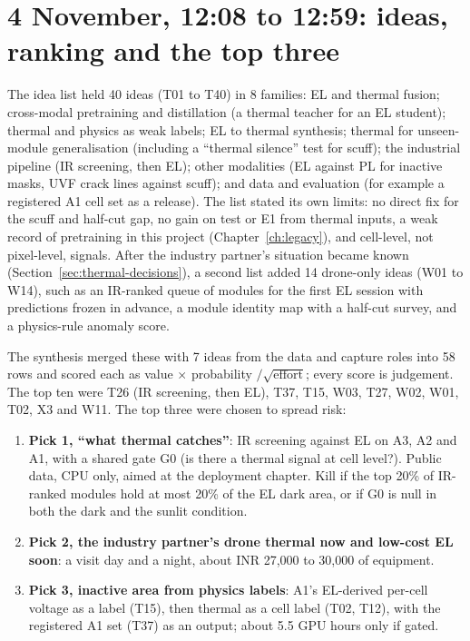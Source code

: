 \section{4 November, 12:08 to 12:59: ideas, ranking and the top three}\label{sec:thermal-ideas}

The idea list held 40 ideas (T01 to T40) in 8 families: EL and thermal fusion; cross-modal pretraining and distillation (a thermal
teacher for an EL student); thermal and physics as weak labels; EL to thermal synthesis; thermal for unseen-module generalisation
(including a ``thermal silence'' test for scuff); the industrial pipeline (IR screening, then EL); other modalities (EL against PL
for inactive masks, UVF crack lines against scuff); and data and evaluation (for example a registered A1 cell set as a release).
The list stated its own limits: no direct fix for the scuff and half-cut gap, no gain on test or E1 from thermal inputs, a weak
record of pretraining in this project (Chapter~\ref{ch:legacy}), and cell-level, not pixel-level, signals. After the industry
partner's situation became known (Section~\ref{sec:thermal-decisions}), a second list added 14 drone-only ideas (W01 to W14), such as
an IR-ranked queue of modules for the first EL session with predictions frozen in advance, a module identity map with a half-cut
survey, and a physics-rule anomaly score.

The synthesis merged these with 7 ideas from the data and capture roles into 58 rows and scored each as value $\times$ probability
$/\sqrt{\text{effort}}$; every score is judgement. The top ten were T26 (IR screening, then EL), T37, T15, W03, T27, W02, W01, T02,
X3 and W11. The top three were chosen to spread risk:
\begin{enumerate}
\item \textbf{Pick 1, ``what thermal catches''}: IR screening against EL on A3, A2 and A1, with a shared gate G0 (is there a thermal
signal at cell level?). Public data, CPU only, aimed at the deployment chapter. Kill if the top 20\% of IR-ranked modules hold at
most 20\% of the EL dark area, or if G0 is null in both the dark and the sunlit condition.
\item \textbf{Pick 2, the industry partner's drone thermal now and low-cost EL soon}: a visit day and a night, about INR 27,000 to
30,000 of equipment.
\item \textbf{Pick 3, inactive area from physics labels}: A1's EL-derived per-cell voltage as a label (T15), then thermal as a cell
label (T02, T12), with the registered A1 set (T37) as an output; about 5.5 GPU hours only if gated.
\end{enumerate}

